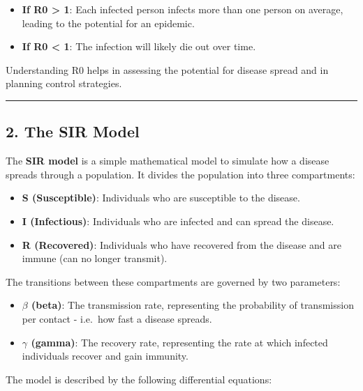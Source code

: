 \documentclass[
]{article}
\providecommand{\tightlist}{%
  \setlength{\itemsep}{0pt}\setlength{\parskip}{0pt}}
\begin{document}
\begin{itemize}
\tightlist
\item
  \textbf{If R0 \textgreater{} 1}: Each infected person infects more
  than one person on average, leading to the potential for an epidemic.
\item
  \textbf{If R0 \textless{} 1}: The infection will likely die out over
  time.
\end{itemize}

Understanding R0 helps in assessing the potential for disease spread and
in planning control strategies.

\begin{center}\rule{0.5\linewidth}{0.5pt}\end{center}

\hypertarget{the-sir-model}{%
\subsection{2. The SIR Model}\label{the-sir-model}}

The \textbf{SIR model} is a simple mathematical model to simulate how a
disease spreads through a population. It divides the population into
three compartments:

\begin{itemize}
\tightlist
\item
  \textbf{S (Susceptible)}: Individuals who are susceptible to the
  disease.
\item
  \textbf{I (Infectious)}: Individuals who are infected and can spread
  the disease.
\item
  \textbf{R (Recovered)}: Individuals who have recovered from the
  disease and are immune (can no longer transmit).
\end{itemize}

The transitions between these compartments are governed by two
parameters:

\begin{itemize}
\tightlist
\item
  \textbf{\(\beta\) (beta)}: The transmission rate, representing the
  probability of transmission per contact - i.e.~how fast a disease
  spreads.
\item
  \textbf{\(\gamma\) (gamma)}: The recovery rate, representing the rate
  at which infected individuals recover and gain immunity.
\end{itemize}

The model is described by the following differential equations:
\end{document}
